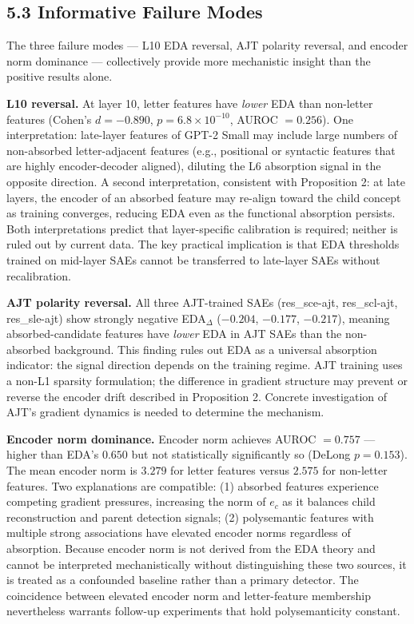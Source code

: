 \documentclass{article}
\begin{document}
\subsection{5.3 Informative Failure Modes}

The three failure modes — L10 EDA reversal, AJT polarity reversal, and encoder norm
dominance — collectively provide more mechanistic insight than the positive results alone.

\textbf{L10 reversal.} At layer 10, letter features have \textit{lower} EDA than non-letter features
(Cohen's $d = -0.890$, $p = 6.8 \times 10^{-10}$, AUROC $= 0.256$). One interpretation:
late-layer features of GPT-2 Small may include large numbers of non-absorbed letter-adjacent
features (e.g., positional or syntactic features that are highly encoder-decoder aligned),
diluting the L6 absorption signal in the opposite direction. A second interpretation, consistent
with Proposition 2: at late layers, the encoder of an absorbed feature may re-align toward the
child concept as training converges, reducing EDA even as the functional absorption persists.
Both interpretations predict that layer-specific calibration is required; neither is ruled out
by current data. The key practical implication is that EDA thresholds trained on mid-layer
SAEs cannot be transferred to late-layer SAEs without recalibration.

\textbf{AJT polarity reversal.} All three AJT-trained SAEs (res_sce-ajt, res_scl-ajt, res_sle-ajt)
show strongly negative EDA$_\Delta$ ($-0.204$, $-0.177$, $-0.217$), meaning absorbed-candidate
features have \textit{lower} EDA in AJT SAEs than the non-absorbed background. This finding rules out
EDA as a universal absorption indicator: the signal direction depends on the training regime.
AJT training uses a non-L1 sparsity formulation; the difference in gradient structure may prevent
or reverse the encoder drift described in Proposition 2. Concrete investigation of AJT's
gradient dynamics is needed to determine the mechanism.

\textbf{Encoder norm dominance.} Encoder norm achieves AUROC $= 0.757$ — higher than EDA's $0.650$
but not statistically significantly so (DeLong $p = 0.153$). The mean encoder norm is $3.279$
for letter features versus $2.575$ for non-letter features. Two explanations are compatible:
(1) absorbed features experience competing gradient pressures, increasing the norm of $e_c$
as it balances child reconstruction and parent detection signals; (2) polysemantic features
with multiple strong associations have elevated encoder norms regardless of absorption.
Because encoder norm is not derived from the EDA theory and cannot be interpreted mechanistically
without distinguishing these two sources, it is treated as a confounded baseline rather than a
primary detector. The coincidence between elevated encoder norm and letter-feature membership
nevertheless warrants follow-up experiments that hold polysemanticity constant.
\end{document}
